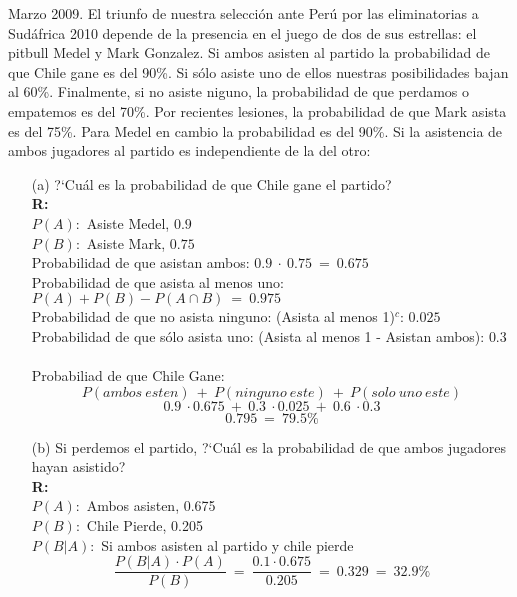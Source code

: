 Marzo 2009. El triunfo de nuestra selecci\'on ante Perú por las eliminatorias a Sud\'africa 2010 depende de la presencia en el juego de dos de sus estrellas:
el pitbull Medel y Mark Gonzalez. Si ambos asisten al partido la probabilidad de que Chile gane es del 90\%. Si s\'olo asiste uno de ellos nuestras posibilidades
bajan al 60\%. Finalmente, si no asiste niguno, la probabilidad de que perdamos o empatemos es del 70\%. Por recientes lesiones, la probabilidad de que Mark
asista es del 75\%. Para Medel en cambio la probabilidad es del 90\%. Si la asistencia de ambos jugadores al partido es independiente de la del otro:
\begin{itemize}
	\item[(a)] ?`Cu\'al es la probabilidad de que Chile gane el partido?\\
		\textbf{R:}\\
		$P(A):$ Asiste Medel, $0.9$\\
		$P(B):$ Asiste Mark, $0.75$\\
		Probabilidad de que asistan ambos: $0.9\ \cdot\ 0.75\ =\ 0.675$\\
		Probabilidad de que asista al menos uno: $P(A)+P(B)-P(A\cap B)\ =\ 0.975$\\
		Probabilidad de que no asista ninguno: (Asista al menos 1)$^c$: $0.025$ \\
		Probabilidad de que s\'olo asista uno: (Asista al menos 1 - Asistan ambos): $0.3$\\\\
		Probabiliad de que Chile Gane:
		$$P(ambos\ esten)\ +\ P(ninguno\ este)\ +\ P(solo\ uno\ este)$$
		$$0.9\ \cdot 0.675\ +\ 0.3\ \cdot 0.025\ +\ 0.6\ \cdot 0.3$$
		$$0.795\ =\ 79.5\%$$
	\item[(b)] Si perdemos el partido, ?`Cu\'al es la probabilidad de que ambos jugadores hayan asistido?\\
		\textbf{R:}\\
		$P(A):$ Ambos asisten, 0.675\\
		$P(B):$ Chile Pierde, 0.205\\
		$P(B|A):$ Si ambos asisten al partido y chile pierde\\
		$$\frac{P(B|A)\cdot P(A)}{P(B)}\ =\ \frac{0.1\cdot 0.675}{0.205}\ =\ 0.329\ =\ 32.9\%$$


\end{itemize}
